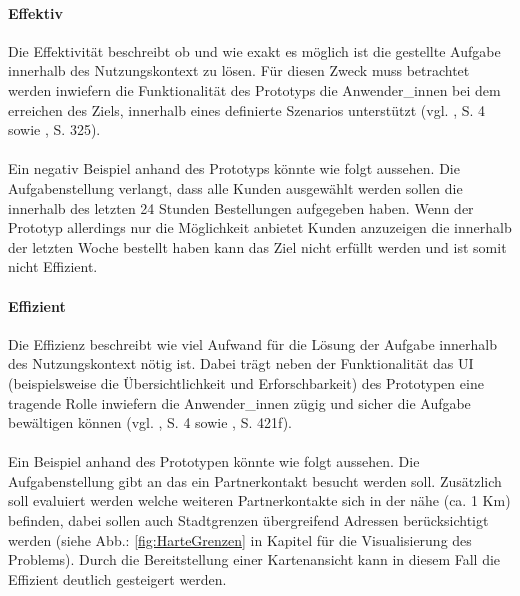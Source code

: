 \documentclass[Bachelorarbeit.tex]{subfiles}
\begin{document}
\paragraph{Effektiv}
Die Effektivität beschreibt ob und wie exakt es möglich ist die gestellte Aufgabe innerhalb des Nutzungskontext zu lösen.
Für diesen Zweck muss betrachtet werden inwiefern die Funktionalität des Prototyps die Anwender\_innen bei dem erreichen des Ziels, innerhalb eines definierte Szenarios unterstützt (vgl. \cite{Iso9241_11}, S. 4 sowie \cite{Burmester}, S. 325). \\
\\
Ein negativ Beispiel anhand des Prototyps könnte wie folgt aussehen.
Die Aufgabenstellung verlangt, dass alle Kunden ausgewählt werden sollen die innerhalb des letzten 24 Stunden Bestellungen aufgegeben haben. 
Wenn der Prototyp allerdings nur die Möglichkeit anbietet Kunden anzuzeigen die innerhalb der letzten Woche bestellt haben kann das Ziel nicht erfüllt werden und ist somit nicht Effizient.

\paragraph{Effizient}
Die Effizienz beschreibt wie viel Aufwand für die Lösung der Aufgabe innerhalb des Nutzungskontext nötig ist. 
Dabei trägt neben der Funktionalität das \ac{UI} (beispielsweise die Übersichtlichkeit und Erforschbarkeit) des Prototypen eine tragende Rolle inwiefern die Anwender\_innen zügig und sicher die Aufgabe bewältigen können (vgl. \cite{Iso9241_11}, S. 4 sowie \cite{Niegemann2008}, S. 421f).\\
\\
Ein Beispiel anhand des Prototypen könnte wie folgt aussehen.
Die Aufgabenstellung gibt an das ein Partnerkontakt besucht werden soll. Zusätzlich soll evaluiert werden welche weiteren Partnerkontakte sich in der nähe (ca. 1 Km) befinden, dabei sollen auch Stadtgrenzen übergreifend Adressen berücksichtigt werden (siehe Abb.: \ref{fig:HarteGrenzen} in Kapitel  für die Visualisierung des Problems).
Durch die Bereitstellung einer Kartenansicht kann in diesem Fall die Effizient deutlich gesteigert werden. 
\end{document}
